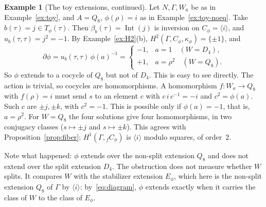 \documentclass[12pt,letterpaper]{article}
\numberwithin{equation}{section}
\theoremstyle{plain}
\theoremstyle{definition}
\newtheorem{example}[theorem]{Example}
\DeclareMathOperator{\Int}{Int}
\begin{document}
\begin{example}[The toy extensions, continued]\label{ex:toy-obstruction}
Let $N,\Gamma,W_a$ be as in Example~\ref{ex:toy}, and $A=Q_8$,
$\phi(\rho)=i$ as in Example~\ref{ex:toy-noeq}. Take $b(\tau)=j\in
T_\phi(\tau)$. Then $\beta_b(\tau)=\Int(j)$ is inversion on
$C_\phi=\langle i\rangle$, and $u_b(\tau,\tau)=j^2=-1$. By
Example~\ref{ex:H2}(b), $H^2(\Gamma,C_\phi,\kappa_\phi)=\{\pm1\}$, and
\[
\partial\phi=u_b(\tau,\tau)\,\phi(a)^{-1}=
\begin{cases}-1,& a=1\quad (W=D_4),\\ +1,& a=\rho^2\quad (W=Q_8).\end{cases}
\]
So $\phi$ extends to a cocycle of $Q_8$ but not of $D_4$. This is easy to
see directly. The action is trivial, so cocycles are homomorphisms. A
homomorphism $f:W_a\to Q_8$ with $f(\rho)=i$ must send $s$ to an element
$c$ with $c\,i\,c^{-1}=-i$ and $c^2=\phi(a)$. Such $c$ are $\pm j,\pm k$,
with $c^2=-1$. This is possible only if $\phi(a)=-1$, that is, $a=\rho^2$.
For $W=Q_8$ the four solutions give four homomorphisms, in two conjugacy
classes ($s\mapsto\pm j$ and $s\mapsto\pm k$). This agrees with
Proposition~\ref{prop:fiber}: $H^1(\Gamma,{}_fC_\phi)$ is
$\langle i\rangle$ modulo squares, of order~$2$.

Note what happened: $\phi$ extends over the non-split extension $Q_8$ and
does not extend over the split extension $D_4$. The obstruction does not
measure whether $W$ splits. It compares $W$ with the stabilizer extension
$E_\phi$, which here is the non-split extension $Q_8$ of $\Gamma$ by
$\langle i\rangle$: by~\eqref{eq:diagram}, $\phi$ extends exactly when it
carries the class of $W$ to the class of $E_\phi$.
\end{example}
\end{document}

